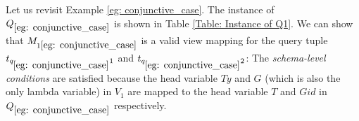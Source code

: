 \begin{example}\label{eg: conditions_conjunctive}
Let us revisit Example \ref{eg: conjunctive_case}. The instance of $Q_{\ref{eg: conjunctive_case}}$ is shown in Table \ref{Table: Instance of Q1}. We can show that $M_{1\ref{eg: conjunctive_case}}$ is a valid view mapping for the query tuple $t_{q_{\ref{eg: conjunctive_case}}1}$ and $t_{q_{\ref{eg: conjunctive_case}}2}$: The {\em schema-level conditions} are satisfied because the head variable $Ty$ and $G$ (which is also the only lambda variable) in $V_1$ are mapped to the head variable $T$ and $Gid$ in $Q_{\ref{eg: conjunctive_case}}$ respectively. %


\end{example}
